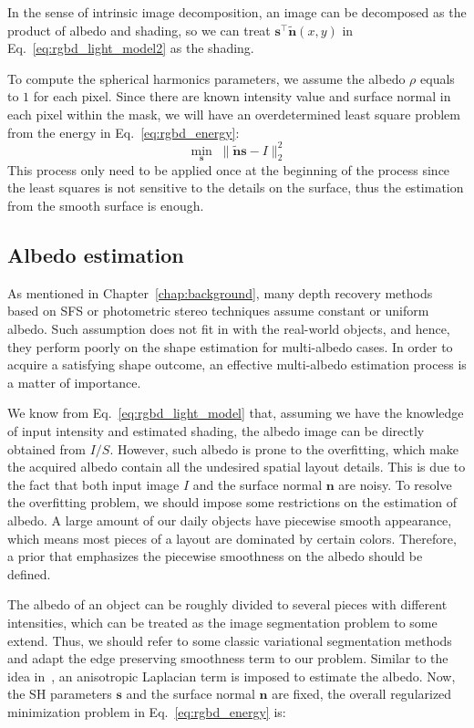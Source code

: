 In the sense of intrinsic image decomposition, an image can be decomposed as the product of albedo and shading, so we can treat $\mathbf{s}^\top \tilde{\mathbf{n}}(x,y) $ in Eq.~\ref{eq:rgbd_light_model2} as the shading.

To compute the spherical harmonics parameters, we assume the albedo $\rho$ equals to $1$ for each pixel. 
Since there are known intensity value and surface normal in each pixel within the mask, we will have an overdetermined least square problem from the energy in Eq.~\ref{eq:rgbd_energy}: 
\begin{equation}\label{eq:rgbd_light_estimate}
\min_{\mathbf{s}} \; \lVert \tilde{\mathbf{n}} \mathbf{s} - I \rVert^2_2
\end{equation}
This process only need to be applied once at the beginning of the process since the least squares is not sensitive to the details on the surface, thus the estimation from the smooth surface is enough.

\subsection{Albedo estimation}\label{sec:rgbd_albedo_estimation}
As mentioned in Chapter~\ref{chap:background}, many depth recovery methods based on SFS or photometric stereo techniques assume constant or uniform albedo.
Such assumption does not fit in with the real-world objects, and hence, they perform poorly on the shape estimation for multi-albedo cases.
In order to acquire a satisfying shape outcome, an effective multi-albedo estimation process is a matter of importance.

We know from Eq.~\ref{eq:rgbd_light_model} that, assuming we have the knowledge of input intensity and estimated shading, the albedo image can be directly obtained from $I/S$.
However, such albedo is prone to the overfitting, which make the acquired albedo contain all the undesired spatial layout details.
This is due to the fact that both input image $I$ and the surface normal $\mathbf{n}$ are noisy.
To resolve the overfitting problem, we should impose some restrictions on the estimation of albedo.
A large amount of our daily objects have piecewise smooth appearance, which means most pieces of a layout are dominated by certain colors.
Therefore, a prior that emphasizes the piecewise smoothness on the albedo should be defined.

The albedo of an object can be roughly divided to several pieces with different intensities, which can be treated as the image segmentation problem to some extend. 
Thus, we should refer to some classic variational segmentation methods and adapt the edge preserving smoothness term to our problem.
Similar to the idea in~\cite{casaca2014laplacian}, an anisotropic Laplacian term is imposed to estimate the albedo.
Now, the SH parameters $\mathbf{s}$ and the surface normal $\mathbf{n}$ are fixed, the overall regularized minimization problem in Eq.~\ref{eq:rgbd_energy} is:

